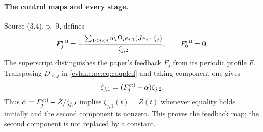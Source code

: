 \paragraph{The control maps and every stage.}
Source (3.4), p.~9, defines
\begin{equation}\label{cvlane:pc:eq:feedback}
 F_j^{\rm ctl}=-\frac{\sum_{1\le i<j}w_i\Omega_i e_{i,1}(Je_i\cdot\zeta_j)}{\zeta_{j,2}},\qquad F_0^{\rm ctl}=0.
\end{equation}
The superscript distinguishes the paper's feedback $F_j$ from its periodic profile $F$. Transposing $D_{<j}$ in \eqref{cvlane:pc:eq:coupled} and taking component one gives
\[
 \dot\zeta_{j,1}=(F_j^{\rm ctl}-\dot\alpha)\zeta_{j,2}.
\]
Thus $\dot\alpha=F_j^{\rm ctl}-\dot Z/\zeta_{j,2}$ implies $\zeta_{j,1}(t)=Z(t)$ whenever equality holds initially and the second component is nonzero. This proves the feedback map; the second component is not replaced by a constant.

